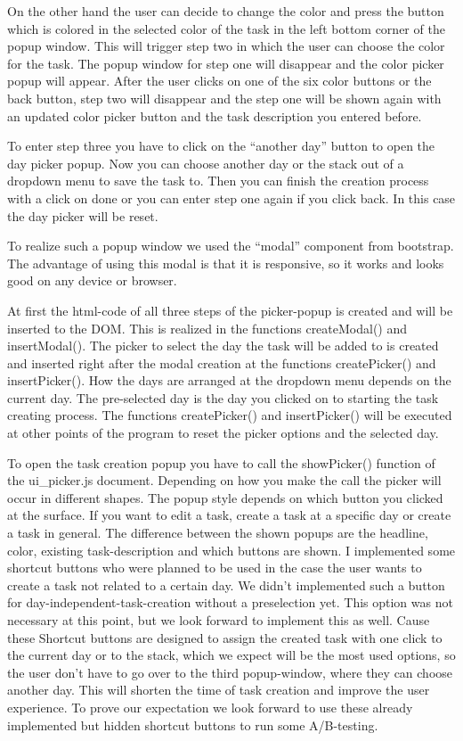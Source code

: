 On the other hand the user can decide to change the color and press the button which is colored in the selected color of the task in the left bottom corner of the popup window. This will trigger step two in which the user can choose the color for the task. The popup window for step one will disappear and the color picker popup will appear. After the user clicks on one of the six color buttons or the back button, step two will disappear and the step one will be shown again with an updated color picker button and the task description you entered before.

To enter step three you have to click on the “another day” button to open the day picker popup. Now you can choose another day or the stack out of a dropdown menu to save the task to. Then you can finish the creation process with a click on done or you can enter step one again if you click back. In this case the day picker will be reset.

To realize such a popup window we used the “modal” component from bootstrap. The advantage of using this modal is that it is responsive, so it works and looks good on any device or browser.  

At first the html-code of all three steps of the picker-popup is created and will be inserted to the DOM. This is realized in the functions createModal() and insertModal(). The picker to select the day the task will be added to is created and inserted right after the modal creation at the functions createPicker() and insertPicker(). How the days are arranged at the dropdown menu depends on the current day. The pre-selected day is the day you clicked on to starting the task creating process. The functions createPicker() and insertPicker() will be executed at other points of the program to reset the picker options and the selected day. 

To open the task creation popup you have to call the showPicker() function of the ui\_picker.js document. Depending on how you make the call the picker will occur in different shapes. The  popup style depends on which button you clicked at the surface. If you want to edit a task, create a task at a specific day or create a task in general. The difference between the shown popups are the headline, color, existing task-description and which buttons are shown. I implemented some shortcut buttons who were planned to be used in the case the user wants to create a task not related to a certain day. We didn’t implemented such a button for day-independent-task-creation without a preselection yet. This option was not necessary at this point, but we look forward to implement this as well. Cause these Shortcut buttons are designed to assign the created task with one click to the current day or to the stack, which we expect will be the most used options, so the user don’t have to go over to the third popup-window, where they can choose another day. This will shorten the time of task creation and improve the user experience. To prove our expectation we look forward to use these already implemented but hidden shortcut buttons to run some A/B-testing.





